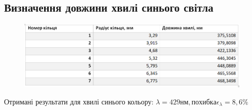 \subsection{Визначення довжини хвилі синього світла}

\begin{figure}[ht]

\centering

\includegraphics[width=0.8\linewidth]{Pics/tabl3.png}


\label{lenght}

\end{figure}
Отримані результати для хвилі синього кольору: $\lambda = 429 нм, похибка \epsilon_{\lambda} = 8,6\%$
